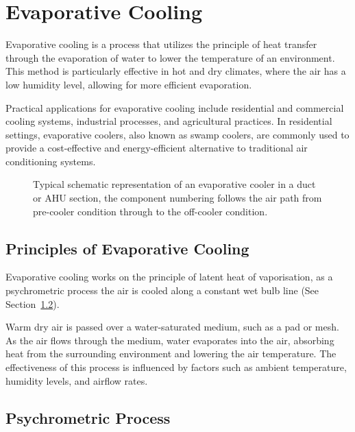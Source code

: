 \chapter{Evaporative Cooling}
\label{chp:evaporative_cooling}

Evaporative cooling is a process that utilizes the principle of heat transfer through the evaporation of water to lower the temperature of an environment. This method is particularly effective in hot and dry climates, where the air has a low humidity level, allowing for more efficient evaporation.

Practical applications for evaporative cooling include residential and commercial cooling systems, industrial processes, and agricultural practices. In residential settings, evaporative coolers, also known as swamp coolers, are commonly used to provide a cost-effective and energy-efficient alternative to traditional air conditioning systems.

\begin{figure}[H]
\centering

\caption{Typical schematic representation of an evaporative cooler in a duct or AHU section, the component numbering follows the air path from pre-cooler condition through to the off-cooler condition.}
\label{fig:DuctEvapCooler}
\end{figure}

\section{Principles of Evaporative Cooling}
\label{sec:principles_evaporative_cooling}

Evaporative cooling works on the principle of latent heat of vaporisation, as a psychrometric process the air is cooled along a constant wet bulb line (See Section~\ref{sec:evap_psychrometricprocess}).

Warm dry air is passed over a water-saturated medium, such as a pad or mesh. As the air flows through the medium, water evaporates into the air, absorbing heat from the surrounding environment and lowering the air temperature. The effectiveness of this process is influenced by factors such as ambient temperature, humidity levels, and airflow rates.

\section{Psychrometric Process}
\label{sec:evap_psychrometricprocess}

